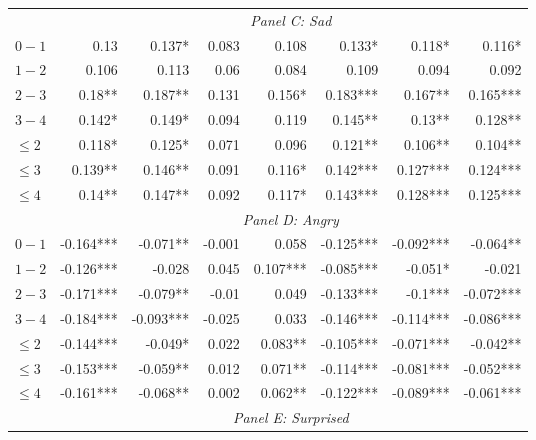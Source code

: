 \documentclass[]{article}
\begin{document}
\begin{table}[!htb]
\begin{tabular}{lrrrrrrr}
& \multicolumn{7}{c}{\emph{Panel C: Sad}}\\ 

\cmidrule(lr){1-1} \cmidrule(lr){2-8}
$0-1$ & 0.13      & 0.137*    & 0.083     & 0.108     & 0.133*    & 0.118*    & 0.116*    \\ 
  $1-2$ & 0.106     & 0.113     & 0.06      & 0.084     & 0.109     & 0.094     & 0.092     \\ 
  $2-3$ & 0.18**    & 0.187**   & 0.131     & 0.156*    & 0.183***  & 0.167**   & 0.165***  \\ 
  $3-4$ & 0.142*    & 0.149*    & 0.094     & 0.119     & 0.145**   & 0.13**    & 0.128**   \\ 
$\leq 2$ & 0.118*    & 0.125*    & 0.071     & 0.096     & 0.121**   & 0.106**   & 0.104**   \\ 
$\leq 3$ & 0.139**   & 0.146**   & 0.091     & 0.116*    & 0.142***  & 0.127***  & 0.124***  \\ 
$\leq 4$ & 0.14**    & 0.147**   & 0.092     & 0.117*    & 0.143***  & 0.128***  & 0.125***  \\ 
\cmidrule(lr){2-8} 

& \multicolumn{7}{c}{\emph{Panel D: Angry}}\\ 

\cmidrule(lr){1-1} \cmidrule(lr){2-8}
$0-1$ & -0.164*** & -0.071**  & -0.001    & 0.058     & -0.125*** & -0.092*** & -0.064**  \\ 
  $1-2$ & -0.126*** & -0.028    & 0.045     & 0.107***  & -0.085*** & -0.051*   & -0.021    \\ 
  $2-3$ & -0.171*** & -0.079**  & -0.01     & 0.049     & -0.133*** & -0.1***   & -0.072*** \\ 
  $3-4$ & -0.184*** & -0.093*** & -0.025    & 0.033     & -0.146*** & -0.114*** & -0.086*** \\ 
$\leq 2$ & -0.144*** & -0.049*   & 0.022     & 0.083**   & -0.105*** & -0.071*** & -0.042**  \\ 
$\leq 3$ & -0.153*** & -0.059**  & 0.012     & 0.071**   & -0.114*** & -0.081*** & -0.052*** \\ 
$\leq 4$ & -0.161*** & -0.068**  & 0.002     & 0.062**   & -0.122*** & -0.089*** & -0.061*** \\ 
\cmidrule(lr){2-8} 

& \multicolumn{7}{c}{\emph{Panel E: Surprised}}\\ 


\end{tabular}
\end{table}
\end{document}
